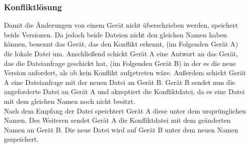 \subsubsection{Konfliktlösung}
Damit die Änderungen von einem Gerät nicht überschrieben werden, speichert \sblit beide Versionen. Da jedoch beide Dateien nicht den gleichen Namen haben können, benennt das Gerät, das den Konflikt erkennt, (im Folgenden Gerät A) die lokale Datei um. Anschließend schickt Gerät A eine Antwort an das Gerät, das die Dateianfrage geschickt hat,  (im Folgenden Gerät B) in der es die neue Version anfordert, als ob kein Konflikt aufgetreten wäre. Außerdem schickt Gerät A eine Dateianfrage mit der neuen Datei an Gerät B. Gerät B sendet nun die angeforderte Datei an Gerät A und akzeptiert die Konfliktdatei, da es eine Datei mit dem gleichen Namen noch nicht besitzt. \\
Nach dem Empfang der Datei speichtert Gerät A diese unter dem ursprünglichen Namen. Des Weiteren sendet Gerät A die Konfliktdatei mit dem geänderten Namen an Gerät B. Die neue Datei wird auf Gerät B unter dem neuen Namen gespeichert.
